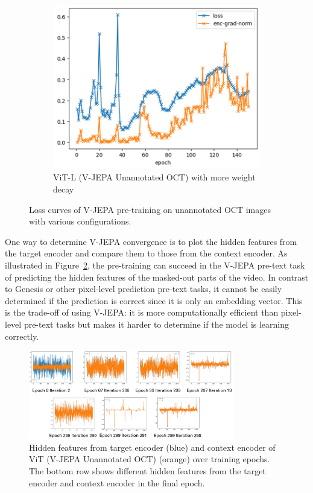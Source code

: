 \documentclass[a4paper,11pt,oneside]{report}
\begin{document}
\begin{figure}[hbt]
\begin{subfigure}[t]{0.3\textwidth}
        \includegraphics[width=0.9\linewidth]{figures/discussion_vjepa_training_3.png}
        \caption{ViT-L (V-JEPA Unannotated OCT) with more weight decay}
    \end{subfigure}
    \caption{Loss curves of V-JEPA pre-training on unannotated OCT images with various configurations.}
    \label{fig:v-jepa-training}
\end{figure}

One way to determine V-JEPA convergence is to plot the hidden features from the target encoder and compare them to those from the context encoder. As illustrated in Figure~\ref{fig:v-jepa-prediction}, the pre-training can succeed in the V-JEPA pre-text task of predicting the hidden features of the masked-out parts of the video. In contrast to Genesis or other pixel-level prediction pre-text tasks, it cannot be easily determined if the prediction is correct since it is only an embedding vector. This is the trade-off of using V-JEPA: it is more computationally efficient than pixel-level pre-text tasks but makes it harder to determine if the model is learning correctly.

\begin{figure}[hbt]
    \centering
    \includegraphics[width=0.8\textwidth]{figures/discussion_vjepa_prediction.png}
    \caption{Hidden features from target encoder (blue) and context encoder of ViT (V-JEPA Unannotated OCT) (orange) over training epochs. The bottom row shows different hidden features from the target encoder and context encoder in the final epoch.}
    \label{fig:v-jepa-prediction}
\end{figure}
\end{document}
